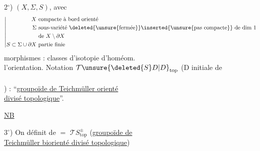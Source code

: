 2$^\circ$) $(X,\Sigma,S)$, avec
\[
\left|
\begin{aligned}
X&\ \text{compacte à bord orienté}\\
\Sigma&\ \text{sous-variété }\deleted{\text{\unsure{fermée}}}
 \inserted{\text{\unsure{pas compacte}}}\ \text{de dim }1\\
&\ \text{de }X\setminus\partial X\\
S\subset\Sigma\cup\partial X&\ \text{partie finie}
\end{aligned}
\right.
\]
morphismes : classes d'isotopie d'homéom. \\
l'orientation. Notation $\mathcal{T}\unsure{\deleted{S}D|D}_{\mathrm{top}}$ (D initiale de\\
\\
) : ``\uline{groupoïde de Teichmüller orienté}\\
\uline{divisé topologique}''.


\uline{NB}\quad
{}

3$^\circ$) On définit de $=$ $\mathcal{T}S^{\pm}_{\mathrm{top}}$
(\uline{groupoïde de}\\
\uline{Teichmüller biorienté divisé topologique})
